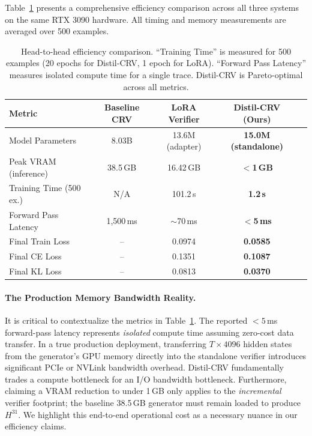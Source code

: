 \documentclass{article}
\begin{document}
Table~\ref{tab:efficiency} presents a comprehensive efficiency comparison across all three systems on the same RTX 3090 hardware. All timing and memory measurements are averaged over 500 examples.

\begin{table}[ht]
\centering
\caption{Head-to-head efficiency comparison. ``Training Time'' is measured for 500 examples (20 epochs for Distil-CRV, 1 epoch for LoRA). ``Forward Pass Latency'' measures isolated compute time for a single trace. Distil-CRV is Pareto-optimal across all metrics.}
\label{tab:efficiency}
\vspace{3pt}
\begin{tabular}{@{}lcccc@{}}
\toprule
\textbf{Metric} & \textbf{Baseline CRV} & \textbf{LoRA Verifier} & \textbf{Distil-CRV (Ours)} \\ \midrule
Model Parameters          & 8.03B   & 13.6M (adapter)       & \textbf{15.0M (standalone)} \\
Peak VRAM (inference)     & 38.5\,GB  & 16.42\,GB             & \textbf{$<$1\,GB}   \\
Training Time (500 ex.)   & N/A       & 101.2\,s              & \textbf{1.2\,s}     \\
Forward Pass Latency      & 1,500\,ms & $\sim$70\,ms          & \textbf{$<$5\,ms}  \\
\midrule
Final Train Loss          & --        & 0.0974                & \textbf{0.0585}     \\
Final CE Loss             & --        & 0.1351                & \textbf{0.1087}     \\
Final KL Loss             & --        & 0.0813                & \textbf{0.0370}     \\
\bottomrule
\end{tabular}
\end{table}

\paragraph{The Production Memory Bandwidth Reality.} It is critical to contextualize the metrics in Table~\ref{tab:efficiency}. The reported $<5$\,ms forward-pass latency represents \emph{isolated} compute time assuming zero-cost data transfer. In a true production deployment, transferring $T \times 4096$ hidden states from the generator's GPU memory directly into the standalone verifier introduces significant PCIe or NVLink bandwidth overhead. Distil-CRV fundamentally trades a compute bottleneck for an I/O bandwidth bottleneck. Furthermore, claiming a VRAM reduction to under 1\,GB only applies to the \emph{incremental} verifier footprint; the baseline 38.5\,GB generator must remain loaded to produce $H^{31}$. We highlight this end-to-end operational cost as a necessary nuance in our efficiency claims.
\end{document}
